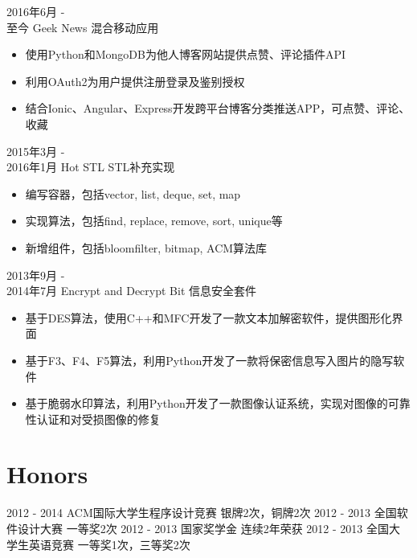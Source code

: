 \documentclass[a4paper]{twentysecondcv} %
\begin{document}
\begin{twenty} %

	
	\twentyitem
	{2016年6月 - \\至今}
	{Geek News}
	{混合移动应用}
	{}
	{
		{\begin{itemize}
				\item 使用Python和MongoDB为他人博客网站提供点赞、评论插件API
				\item 利用OAuth2为用户提供注册登录及鉴别授权
				\item 结合Ionic、Angular、Express开发跨平台博客分类推送APP，可点赞、评论、收藏
		\end{itemize}}
	}

	\twentyitem
	{2015年3月 - \\2016年1月}
	{Hot STL}
	{STL补充实现}
	{}
	{
		{\begin{itemize}
			\item 编写容器，包括vector, list, deque, set, map
			\item 实现算法，包括find, replace, remove, sort, unique等
			\item 新增组件，包括bloomfilter, bitmap, ACM算法库
		\end{itemize}}
	}
	
	\twentyitem
	{2013年9月 - \\2014年7月}
	{Encrypt and Decrypt Bit}
	{信息安全套件}
	{}
	{
		{\begin{itemize}
				\item 基于DES算法，使用C++和MFC开发了一款文本加解密软件，提供图形化界面
				\item 基于F3、F4、F5算法，利用Python开发了一款将保密信息写入图片的隐写软件
				\item 基于脆弱水印算法，利用Python开发了一款图像认证系统，实现对图像的可靠性认证和对受损图像的修复
		\end{itemize}}
	}
	
\end{twenty}


\section{Honors}
\begin{twenty}
	\twentyitemthree
	{2012 - 2014}
	{ACM国际大学生程序设计竞赛}
	{银牌2次，铜牌2次}
	\twentyitemthree
	{2012 - 2013}
	{全国软件设计大赛}
	{一等奖2次}
	\twentyitemthree
	{2012 - 2013}
	{国家奖学金}
	{连续2年荣获}
	\twentyitemthree
	{2012 - 2013}
	{全国大学生英语竞赛}
	{一等奖1次，三等奖2次}
\end{twenty}
\end{document}
